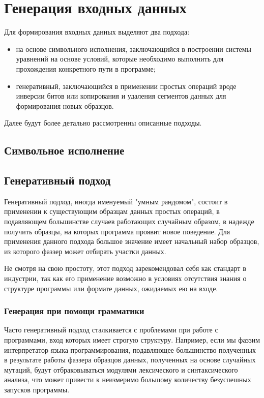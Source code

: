 \section{Генерация входных данных}

Для формирования входных данных выделяют два подхода:

\begin{itemize}
	
	\item на основе символьного исполнения, заключающийся в построении системы уравнений на основе условий, которые необходимо выполнить для прохождения конкретного пути в программе;
	
	\item генеративный, заключающийся в применении простых операций вроде инверсии битов или копирования и удаления сегментов данных для формирования новых образцов.
	
\end{itemize}

Далее будут более детально рассмотренны описанные подходы.

\subsection{Символьное исполнение}


\subsection{Генеративный подход}

Генеративный подход, иногда именуемый "умным рандомом", состоит в применении к существующим образцам данных простых операций, в подавляющем большинстве случаев работающих случайным образом, в надежде получить образцы, на которых программа проявит новое поведение. Для применения данного подхода большое значение имеет начальный набор образцов, из которого фаззер может отбирать участки данных.

Не смотря на свою простоту, этот подход зарекомендовал себя как стандарт в индустрии, так как его применение возможно в условиях отсутствия знания о структуре программы или формате данных, ожидаемых ею на входе.

\subsubsection{Генерация при помощи грамматики}

Часто генеративный подход сталкивается с проблемами при работе с программами, вход которых имеет строгую структуру. Например, если мы фаззим интерпретатор языка программирования, подавляющее большинство полученных в результате работы фаззера образцов данных, полученных на основе случайных мутаций, будут отбраковываться модулями лексического и синтаксического анализа, что может привести к неизмеримо большому количеству безуспешных запусков программы.

